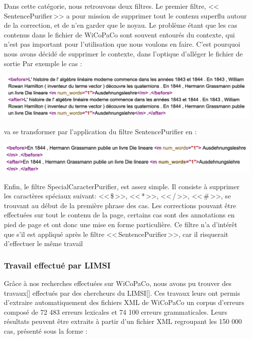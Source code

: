 \documentclass[11pt]{article}
\begin{document}
Dans cette cat\'{e}gorie, nous retrouvons deux filtres. Le premier filtre, <<\,SentencePurifier\,>> a pour mission de supprimer tout le contenu superflu autour de la correction, et de n'en garder que le noyau. Le probl\`{e}me \'{e}tant que les cas contenus dans le fichier de WiCoPaCo sont souvent entour\'{e}s du contexte, qui n'est pas important pour l'utilisation que nous voulons en faire. C'est pourquoi nous avons d\'{e}cid\'{e} de supprimer le contexte, dans l'optique d'all\'{e}ger le fichier de sortie
Par exemple le cas : 

\begin{center}
\includegraphics[width=14cm]{exemple14.png} %
\end{center}
va se transformer par l'application du filtre SentencePurifier en : 
\begin{center}
\includegraphics[width=14cm]{exemple15.png} %
\end{center}
Enfin, le filtre SpecialCaracterPurifier, est assez simple. Il consiste \`{a} supprimer les caract\`{e}res sp\'{e}ciaux suivant: <<\,\$\,>>, <<\,*\,>>, <<\,/\,>>, <<\,\#\,>>, se trouvant au d\'{e}but de la premi\`{e}re phrase des cas. Les corrections pouvant \^{e}tre effectu\'{e}es sur tout le contenu de la page, certains cas sont des annotations en pied de page et ont donc une mise en forme particuli\`{e}re.
Ce filtre n'a d'int\'{e}r\^{e}t que s'il est appliqu\'{e} apr\`{e}s le filtre <<\,SentencePurifier\,>>, car il risquerait d'effectuer le m\^{e}me travail


\subsubsection{Travail effectu\'{e} par LIMSI}

Gr\^{a}ce \`{a} nos recherches effectu\'{e}es sur WiCoPaCo, nous avons pu trouver des travaux[\cite[4]{4}] effectu\'{e}s par des chercheurs du LIMSI[\cite[3]{3}]. Ces travaux \autocite[1]{https://wicopaco.limsi.fr/pub/taln10.pdf} leurs ont permis d'extraire automatiquement des fichiers XML de WiCoPaCo un corpus d'erreurs compos\'{e} de 72 483 erreurs lexicales et 74 100 erreurs grammaticales. Leurs r\'{e}sultats peuvent \^{e}tre extraits 
\`{a} partir d'un fichier XML regroupant les 150 000 cas, pr\'{e}sent\'{e} sous la forme :
\end{document}
